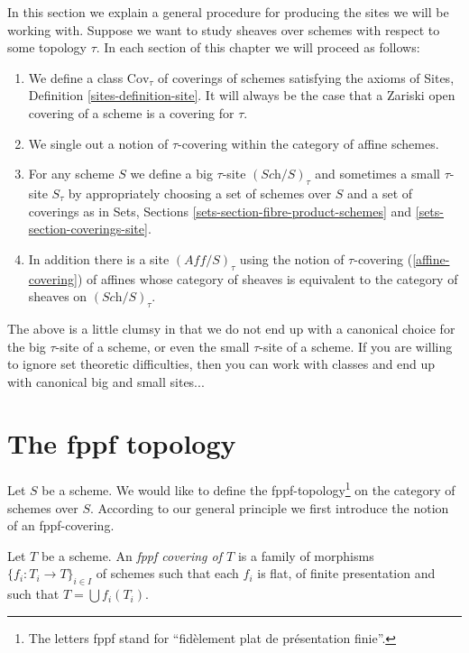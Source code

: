\noindent
In this section we explain a general procedure for producing the
sites we will be working with. Suppose we want to study sheaves
over schemes with
respect to some topology $\tau$. In each section of this chapter
we will proceed as follows:
\begin{enumerate}
\item We define a class $\text{Cov}_\tau$ of coverings of schemes
satisfying the axioms of Sites, Definition \ref{sites-definition-site}.
It will always be the case that a Zariski open covering of
a scheme is a covering for $\tau$.
\item\label{affine-covering}
We single out a notion of $\tau$-covering within the category
of affine schemes.
\item For any scheme $S$ we define a big $\tau$-site
$(\textit{Sch}/S)_\tau$ and sometimes a small $\tau$-site
$S_\tau$ by appropriately choosing a set of schemes over $S$
and a set of coverings as in Sets, Sections
\ref{sets-section-fibre-product-schemes} and
\ref{sets-section-coverings-site}.
\item In addition there is a site $(\textit{Aff}/S)_\tau$ using the
notion of $\tau$-covering (\ref{affine-covering}) of affines whose
category of sheaves
is equivalent to the category of sheaves on $(\textit{Sch}/S)_\tau$.
\end{enumerate}
The above is a little clumsy in that we do not end up with a canonical
choice for the big $\tau$-site of a scheme, or even the small
$\tau$-site of a scheme. If you are willing to ignore set theoretic
difficulties, then you can work with classes and end up with
canonical big and small sites...











\section{The fppf topology}
\label{section-fppf}

\noindent
Let $S$ be a scheme. We would like to define the fppf-topology\footnote{
The letters fppf stand for ``fid\`element plat de pr\'esentation finie''.} on
the category of schemes over $S$. According to our general principle
we first introduce the notion of an fppf-covering.

\begin{definition}
\label{definition-fppf-covering}
Let $T$ be a scheme. An {\it fppf covering of $T$} is a family
of morphisms $\{f_i : T_i \to T\}_{i \in I}$ of schemes
such that each $f_i$ is flat, of finite presentation and such
that $T = \bigcup f_i(T_i)$.
\end{definition}

